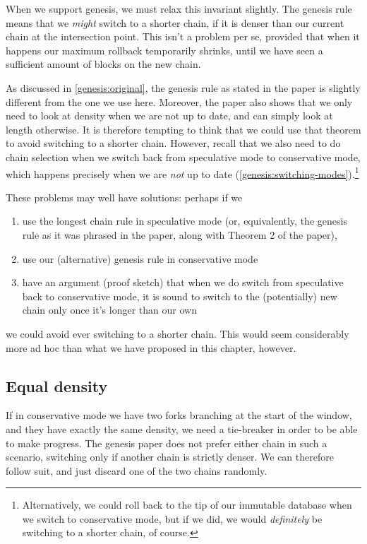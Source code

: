 When we support genesis, we must relax this invariant slightly. The genesis
rule means that we \emph{might} switch to a shorter chain, if it is denser
than our current chain at the intersection point. This isn't a problem per se,
provided that when it happens our maximum rollback temporarily shrinks, until
we have seen a sufficient amount of blocks on the new chain.

As discussed in \cref{genesis:original}, the genesis rule as stated in the
paper is slightly different from the one we use here. Moreover, the paper
also shows \cite[Theorem 2]{cryptoeprint:2018:378} that we only need to
look at density when we are not up to date, and can simply look at length
otherwise. It is therefore tempting to think that we could use that theorem
to avoid switching to a shorter chain. However, recall that we also need to do
chain selection when we switch back from speculative mode to conservative mode,
which happens precisely when we are \emph{not} up to date
(\cref{genesis:switching-modes}).\footnote{Alternatively, we could roll back to
the tip of our immutable database when we switch to conservative mode, but if we
did, we would \emph{definitely}  be switching to a shorter chain, of course.}

These problems may well have solutions: perhaps if we
%
\begin{enumerate}
\item use the longest chain rule in speculative mode (or,
equivalently, the genesis rule as it was phrased in the paper, along with
Theorem 2 of the paper),
\item use our (alternative) genesis rule in conservative mode
\item have an argument (proof sketch) that when we do switch from speculative
back to conservative mode, it is sound to switch to the (potentially) new chain
only once it's longer than our own
\end{enumerate}
%
we could avoid ever switching to a shorter chain. This would seem considerably
more ad hoc than what we have proposed in this chapter, however.

\subsection{Equal density}

If in conservative mode we have two forks branching at the start of the window,
and they have exactly the same density, we need a tie-breaker in order to be
able to make progress. The genesis paper does not prefer either chain in such
a scenario, switching only if another chain is strictly denser. We can therefore
follow suit, and just discard one of the two chains randomly.

